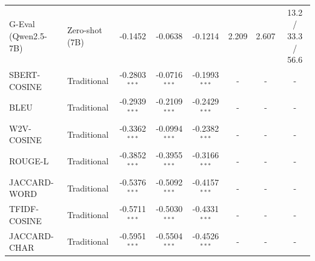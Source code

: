 \begin{table}[t]
{\begin{tabular}{llcccccc}
G-Eval (Qwen2.5-7B) & Zero-shot (7B) & -0.1452 & -0.0638 & -0.1214 & 2.209 & 2.607 & 13.2 / 33.3 / 56.6 \\
SBERT-COSINE & Traditional & -0.2803$^{***}$ & -0.0716$^{***}$ & -0.1993$^{***}$ & - & - & - \\
BLEU & Traditional & -0.2939$^{***}$ & -0.2109$^{***}$ & -0.2429$^{***}$ & - & - & - \\
W2V-COSINE & Traditional & -0.3362$^{***}$ & -0.0994$^{***}$ & -0.2382$^{***}$ & - & - & - \\
ROUGE-L & Traditional & -0.3852$^{***}$ & -0.3955$^{***}$ & -0.3166$^{***}$ & - & - & - \\
JACCARD-WORD & Traditional & -0.5376$^{***}$ & -0.5092$^{***}$ & -0.4157$^{***}$ & - & - & - \\
TFIDF-COSINE & Traditional & -0.5711$^{***}$ & -0.5030$^{***}$ & -0.4331$^{***}$ & - & - & - \\
JACCARD-CHAR & Traditional & -0.5951$^{***}$ & -0.5504$^{***}$ & -0.4526$^{***}$ & - & - & - \\
\bottomrule
\end{tabular}
}
\end{table}